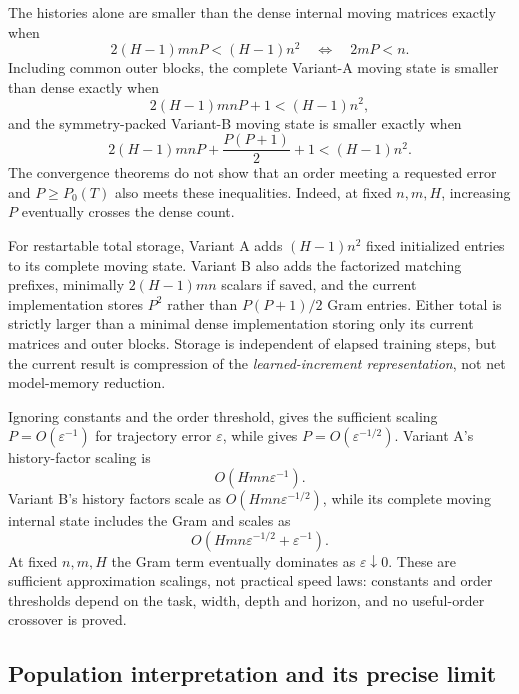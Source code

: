 \documentclass[11pt]{article}
\theoremstyle{definition}
\theoremstyle{remark}
\begin{document}
The histories alone are smaller than the dense internal moving matrices exactly
when
\begin{equation}
 2(H-1)mnP<(H-1)n^2
 \quad\Longleftrightarrow\quad 2mP<n.                \label{eq:history-crossover}
\end{equation}
Including common outer blocks, the complete Variant-A moving state is smaller
than dense exactly when
\[
 2(H-1)mnP+1<(H-1)n^2,
\]
and the symmetry-packed Variant-B moving state is smaller exactly when
\begin{equation}
 2(H-1)mnP+\frac{P(P+1)}2+1<(H-1)n^2.               \label{eq:new-crossover}
\end{equation}
The convergence theorems do not show that an order meeting a requested error
and $P\ge P_0(T)$ also meets these inequalities.  Indeed, at fixed
$n,m,H$, increasing $P$ eventually crosses the dense count.

For restartable total storage, Variant A adds $(H-1)n^2$ fixed initialized
entries to its complete moving state.  Variant B also adds the factorized
matching prefixes, minimally $2(H-1)mn$ scalars if saved, and the current
implementation stores $P^2$ rather than $P(P+1)/2$ Gram entries.  Either total
is strictly larger than a minimal dense implementation storing only its
current matrices and outer blocks.  Storage is independent of elapsed training
steps, but the current result is compression of the \emph{learned-increment
representation}, not net model-memory reduction.

Ignoring constants and the order threshold,  gives the sufficient
scaling $P=O(\varepsilon^{-1})$ for trajectory error $\varepsilon$, while
 gives $P=O(\varepsilon^{-1/2})$.  Variant A's history-factor
scaling is
\[
 O(Hmn\varepsilon^{-1}).
\]
Variant B's history factors scale as $O(Hmn\varepsilon^{-1/2})$, while its
complete moving internal state includes the Gram and scales as
\begin{equation}
 O\!\left(Hmn\varepsilon^{-1/2}+\varepsilon^{-1}\right).
 \label{eq:new-state-epsilon}
\end{equation}
At fixed $n,m,H$ the Gram term eventually dominates as
$\varepsilon\downarrow0$.  These are sufficient approximation scalings, not
practical speed laws: constants and order thresholds depend on the task,
width, depth and horizon, and no useful-order crossover is proved.

\subsection{Population interpretation and its precise limit}
\end{document}
